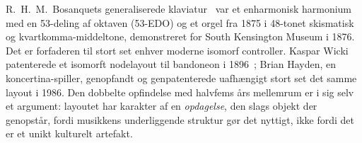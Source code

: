 \documentclass[10pt,letterpaper,twocolumn]{article}
\begin{document}
R.\ H.\ M.\ Bosanquets generaliserede klaviatur~\citep{bosanquet1875generalized} var et enharmonisk harmonium med en 53-deling af oktaven (53-EDO) og et orgel fra 1875 i 48-tonet skismatisk og kvartkomma-middeltone, demonstreret for South Kensington Museum i 1876. Det er forfaderen til stort set enhver moderne isomorf controller. Kaspar Wicki patenterede et isomorft nodelayout til bandoneon i 1896~\citep{wicki1896}; Brian Hayden, en koncertina-spiller, genopfandt og genpatenterede uafhængigt stort set det samme layout i 1986. Den dobbelte opfindelse med halvfems års mellemrum er i sig selv et argument: layoutet har karakter af en \emph{opdagelse}, den slags objekt der genopstår, fordi musikkens underliggende struktur gør det nyttigt, ikke fordi det er et unikt kulturelt artefakt.

\begin{figure}[t]
\centering
{}
\end{figure}
\end{document}
